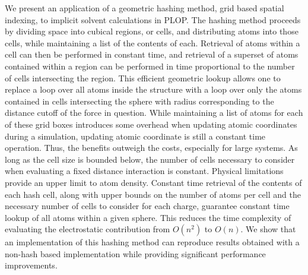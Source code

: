 We present an application of a geometric hashing method, grid based spatial indexing, to implicit solvent calculations in PLOP.
The hashing method proceeds by dividing space into cubical regions, or cells, and distributing atoms into those cells, while maintaining a list of the contents of each.
Retrieval of atoms within a cell can then be performed in constant time, and retrieval of a superset of atoms contained within a region can be performed in time proportional to the number of cells intersecting the region.
This efficient geometric lookup allows one to replace a loop over all atoms inside the structure with a loop over only the atoms contained in cells intersecting the sphere with radius corresponding to the distance cutoff of the force in question.
While maintaining a list of atoms for each of these grid boxes introduces some overhead when updating atomic coordinates during a simulation, updating atomic coordinate is still a constant time operation.
Thus, the benefits outweigh the costs, especially for large systems.
As long as the cell size is bounded below, the number of cells necessary to consider when evaluating a fixed distance interaction is constant.
Physical limitations provide an upper limit to atom density.
Constant time retrieval of the contents of each hash cell, along with upper bounds on the number of atoms per cell and the necessary number of cells to consider for each charge, guarantee constant time lookup of all atoms within a given sphere.
This reduces the time complexity of evaluating the electrostatic contribution from $O(n^2)$ to $O(n)$.
We show that an implementation of this hashing method can reproduce results obtained with a non-hash based implementation while providing significant performance improvements.
